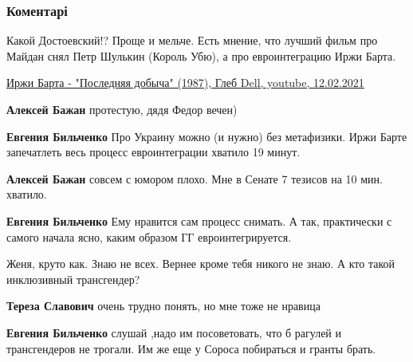  
 
 
 
 
\subsubsection{Коментарі}
\label{sec:17_11_2021.fb.bilchenko_evgenia.1.reklama_vo_svoboda.cmt}

\begin{itemize} %

Какой Достоевский!? Проще и мельче. Есть мнение, что лучший фильм про Майдан
снял Петр Шулькин (Король Убю), а про евроинтеграцию Иржи Барта. 

\href{https://www.youtube.com/watch?v=U5ow2_HFqK0}{%
Иржи Барта - "Последняя добыча" (1987), Глеб Dell, youtube, 12.02.2021%
}

\begin{itemize} %
\textbf{Алексей Бажан} протестую, дядя Федор вечен)

\textbf{Евгения Бильченко} Про Украину можно (и нужно) без метафизики. Иржи Барте запечатлеть весь процесс евроинтеграции хватило 19 минут.


\textbf{Алексей Бажан} совсем с юмором плохо. Мне в Сенате 7 тезисов на 10 мин. хватило.

\textbf{Евгения Бильченко} Ему нравится сам процесс снимать. А так, практически с самого начала ясно, каким образом ГГ евроинтегрируется.
\end{itemize} %


Женя, круто как. Знаю не всех. Вернее кроме тебя никого не знаю. А кто такой
инклюзивный трансгендер?

\begin{itemize} %
\textbf{Тереза Славович} очень трудно понять, но мне тоже не нравица

\textbf{Евгения Бильченко} слушай ,надо им посоветовать, что б рагулей и трансгендеров не трогали. Им же еще у Сороса побираться и гранты брать.



\end{itemize}
\end{itemize}
